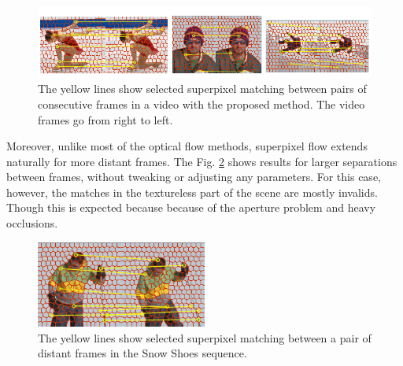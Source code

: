    \begin{figure}[thpb]
      \centering
      \includegraphics[width=1.00\textwidth]{images/matches.png}
      \caption{The yellow lines show selected superpixel
		matching between pairs of consecutive frames in a video
		with the proposed method. The video frames go from right
		to left.}
      \label{figurelabel_matches}
   \end{figure}
 
 Moreover, unlike most of the optical flow methods, superpixel flow extends 
 naturally for more distant frames. The Fig. \ref{figurelabel_matchessnow} shows
 results for larger separations between frames, without tweaking or adjusting any
 parameters. For this case, however, the matches in the textureless part of the scene
 are mostly invalids. Though this is expected because because of the aperture problem and
 heavy occlusions.
 
   \begin{figure}[thpb]
      \centering
      \includegraphics[width=0.5\textwidth]{images/matches_snowshoes.png}
      \caption{The yellow lines show selected superpixel
		matching between a pair of distant frames in the Snow Shoes sequence.}
      \label{figurelabel_matchessnow}
   \end{figure}
   
